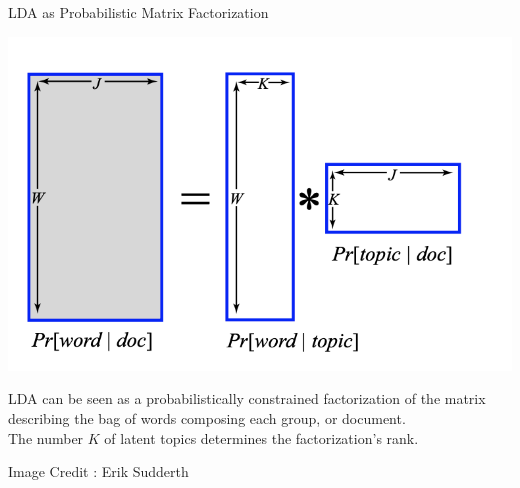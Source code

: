 \documentclass[10pt]{beamer}
\begin{document}
\begin{frame}{LDA as Probabilistic Matrix Factorization}
\scriptsize

\begin{center}
\includegraphics[width=.9\textwidth]{images/lda_as_probabilistic_matrix_factorization}
\end{center}

LDA can be seen as a probabilistically constrained factorization of the matrix describing the bag of words composing each group, or document.  \\
\vfill
The number $K$ of latent topics determines the factorization’s rank.  \\
\vfill

\hfill \tiny Image Credit : Erik Sudderth

\end{frame}
\end{document}
